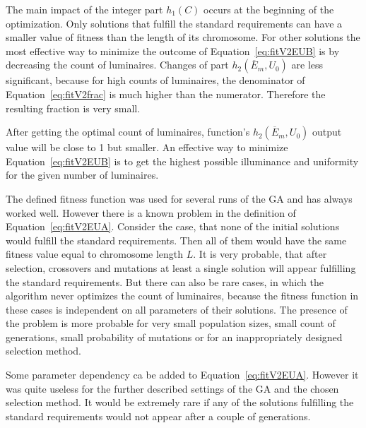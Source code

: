 The main impact of the integer part $h_1\left(C\right)$ occurs at the beginning of the optimization. Only solutions that fulfill the standard requirements can have a smaller value of fitness than the length of its chromosome. For other solutions the most effective way to minimize the outcome of Equation~\ref{eq:fitV2EUB} is by decreasing the count of luminaires. Changes of part $h_2\left(\overline{E}_{m}, U_0\right)$ are less significant, because for high counts of luminaires, the denominator of Equation~\ref{eq:fitV2frac} is much higher than the numerator. Therefore the resulting fraction is very small.

After getting the optimal count of luminaires, function's $h_2\left(\overline{E}_{m}, U_0\right)$ output value will be close to 1 but smaller. An effective way to minimize Equation~\ref{eq:fitV2EUB} is to get the highest possible illuminance and uniformity for the given number of luminaires.

The defined fitness function was used for several runs of the GA and has always worked well. However there is a known problem in the definition of Equation~\ref{eq:fitV2EUA}. Consider the case, that none of the initial solutions would fulfill the standard requirements. Then all of them would have the same fitness value equal to chromosome length $L$. It is very probable, that after selection, crossovers and mutations at least a single solution will appear fulfilling the standard requirements. But there can also be rare cases, in which the algorithm never optimizes the count of luminaires, because the fitness function in these cases is independent on all parameters of their solutions. The presence of the problem is more probable for very small population sizes, small count of generations, small probability of mutations or for an inappropriately designed selection method.

Some parameter dependency ca be added to Equation~\ref{eq:fitV2EUA}. However it was quite useless for the further described settings of the GA and the chosen selection method. It would be extremely rare if any of the solutions fulfilling the standard requirements would not appear after a couple of generations.
